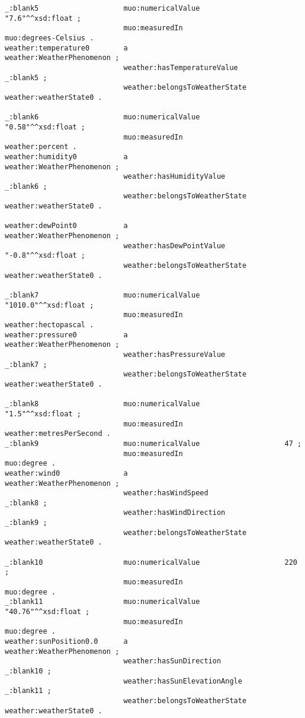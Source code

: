 \begin{lstlisting}
_:blank5                    muo:numericalValue                    "7.6"^^xsd:float ;
                            muo:measuredIn                        muo:degrees-Celsius .
weather:temperature0        a                                     weather:WeatherPhenomenon ;
                            weather:hasTemperatureValue           _:blank5 ;
                            weather:belongsToWeatherState         weather:weatherState0 .

_:blank6                    muo:numericalValue                    "0.58"^^xsd:float ;
                            muo:measuredIn                        weather:percent .
weather:humidity0           a                                     weather:WeatherPhenomenon ;
                            weather:hasHumidityValue              _:blank6 ;
                            weather:belongsToWeatherState         weather:weatherState0 .

weather:dewPoint0           a                                     weather:WeatherPhenomenon ;
                            weather:hasDewPointValue              "-0.8"^^xsd:float ;
                            weather:belongsToWeatherState         weather:weatherState0 .

_:blank7                    muo:numericalValue                    "1010.0"^^xsd:float ;
                            muo:measuredIn                        weather:hectopascal .
weather:pressure0           a                                     weather:WeatherPhenomenon ;
                            weather:hasPressureValue              _:blank7 ;
                            weather:belongsToWeatherState         weather:weatherState0 .

_:blank8                    muo:numericalValue                    "1.5"^^xsd:float ;
                            muo:measuredIn                        weather:metresPerSecond .
_:blank9                    muo:numericalValue                    47 ;
                            muo:measuredIn                        muo:degree .
weather:wind0               a                                     weather:WeatherPhenomenon ;
                            weather:hasWindSpeed                  _:blank8 ;
                            weather:hasWindDirection              _:blank9 ;
                            weather:belongsToWeatherState         weather:weatherState0 .

_:blank10                   muo:numericalValue                    220 ;
                            muo:measuredIn                        muo:degree .
_:blank11                   muo:numericalValue                    "40.76"^^xsd:float ;
                            muo:measuredIn                        muo:degree .
weather:sunPosition0.0      a                                     weather:WeatherPhenomenon ;
                            weather:hasSunDirection               _:blank10 ;
                            weather:hasSunElevationAngle          _:blank11 ;
                            weather:belongsToWeatherState         weather:weatherState0 .


\end{lstlisting}
